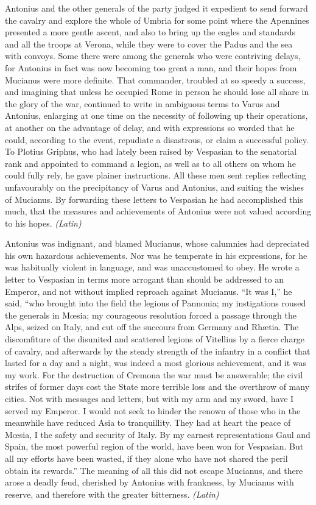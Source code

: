 
Antonius and the other generals of the party judged it expedient to send forward the cavalry and explore the whole of Umbria for some point where the Apennines presented a more gentle ascent, and also to bring up the eagles and standards and all the troops at Verona, while they were to cover the Padus and the sea with convoys. Some there were among the generals who were contriving delays, for Antonius in fact was now becoming too great a man, and their hopes from Mucianus were more definite. That commander, troubled at so speedy a success, and imagining that unless he occupied Rome in person he should lose all share in the glory of the war, continued to write in ambiguous terms to Varus and Antonius, enlarging at one time on the necessity of following up their operations, at another on the advantage of delay, and with expressions so worded that he could, according to the event, repudiate a disastrous, or claim a successful policy. To Plotius Griphus, who had lately been raised by Vespasian to the senatorial rank and appointed to command a legion, as well as to all others on whom he could fully rely, he gave plainer instructions. All these men sent replies reflecting unfavourably on the precipitancy of Varus and Antonius, and suiting the wishes of Mucianus. By forwarding these letters to Vespasian he had accomplished this much, that the measures and achievements of Antonius were not valued according to his hopes. \emph{(Latin)}


Antonius was indignant, and blamed Mucianus, whose calumnies had depreciated his own hazardous achievements. Nor was he temperate in his expressions, for he was habitually violent in language, and was unaccustomed to obey. He wrote a letter to Vespasian in terms more arrogant than should be addressed to an Emperor, and not without implied reproach against Mucianus. ``It was I,'' he said, ``who brought into the field the legions of Pannonia; my instigations roused the generals in Mœsia; my courageous resolution forced a passage through the Alps, seized on Italy, and cut off the succours from Germany and Rhætia. The discomfiture of the disunited and scattered legions of Vitellius by a fierce charge of cavalry, and afterwards by the steady strength of the infantry in a conflict that lasted for a day and a night, was indeed a most glorious achievement, and it was my work. For the destruction of Cremona the war must be answerable; the civil strifes of former days cost the State more terrible loss and the overthrow of many cities. Not with messages and letters, but with my arm and my sword, have I served my Emperor. I would not seek to hinder the renown of those who in the meanwhile have reduced Asia to tranquillity. They had at heart the peace of Mœsia, I the safety and security of Italy. By my earnest representations Gaul and Spain, the most powerful region of the world, have been won for Vespasian. But all my efforts have been wasted, if they alone who have not shared the peril obtain its rewards.'' The meaning of all this did not escape Mucianus, and there arose a deadly feud, cherished by Antonius with frankness, by Mucianus with reserve, and therefore with the greater bitterness. \emph{(Latin)}

